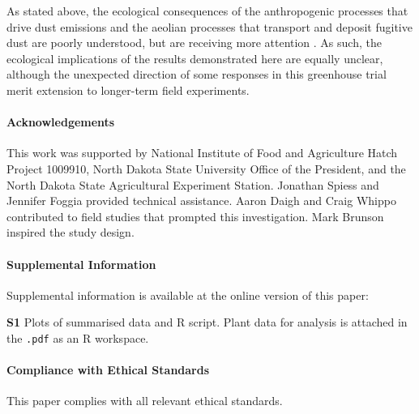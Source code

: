\documentclass{svjour3}
\begin{document}
As stated above, the ecological consequences of the anthropogenic processes that drive dust emissions and the  aeolian processes that transport and deposit fugitive dust are poorly understood, but are receiving more attention \citep{field2010}. 
As such, the ecological implications of the results demonstrated here are equally unclear, although the unexpected direction of some responses in this greenhouse trial merit extension to longer-term field experiments. 


\paragraph{Acknowledgements}
This work was supported by National Institute of Food and Agriculture Hatch Project 1009910, North Dakota State University Office of the President, and the North Dakota State Agricultural Experiment Station.
Jonathan Spiess and Jennifer Foggia provided technical assistance. 
Aaron Daigh and Craig Whippo contributed to field studies that prompted this investigation.
Mark Brunson inspired the study design.

\paragraph{Supplemental Information}

Supplemental information is available at the online version of this paper:

\textbf{S1} Plots of summarised data and \textsf{R} script.
Plant data for analysis is attached in the \texttt{.pdf} as an \textsf{R} workspace.

\paragraph{Compliance with Ethical Standards}
This paper complies with all relevant ethical standards. 

      
 
\end{document}

